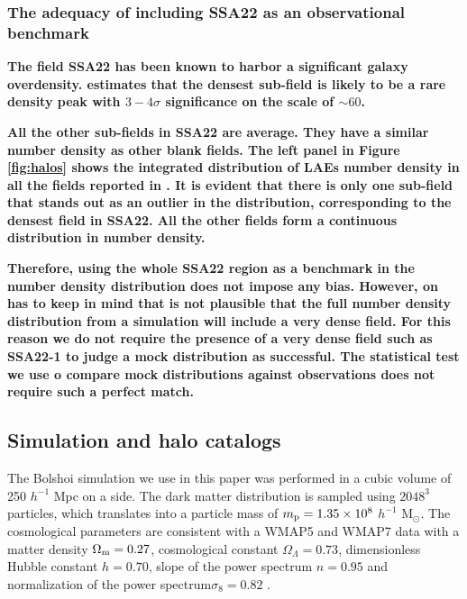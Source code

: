 \documentclass[usenatbib]{mn2e}
\newcommand{\hMpc}{{\ifmmode{h^{-1}{\rm Mpc}}\else{$h^{-1}$Mpc }\fi}}
\begin{document}
\subsubsection{The adequacy of including SSA22 as an observational benchmark}

{\bf The field SSA22 has been known to harbor a significant
  galaxy overdensity. \cite{Yamada2012} estimates that the densest
  sub-field is likely to be a rare density peak with $3-4\sigma$
  significance on the scale of $\sim 60$\hMpc. }

{\bf All the other sub-fields in SSA22 are average. They have a similar
  number density as other blank fields. The left panel in Figure
  \ref{fig:halos} shows the integrated distribution of LAEs number
  density in all the fields reported in  \cite{Yamada2012}. It is
  evident that there is only one sub-field  that stands out as an
  outlier in the distribution, corresponding to  the densest field in
  SSA22. All the other fields form a continuous  distribution in
  number density.}   

{\bf Therefore, using the whole SSA22 region as a benchmark in the
  number density distribution does not impose any bias. However, on
  has to  keep in mind that is not plausible that the full number
  density distribution from a simulation will include a very dense
  field. For this reason we do not require the presence of a very
  dense field such as SSA22-1 to judge a mock distribution as
  successful. The statistical test we use o compare mock
  distributions against observations does not require such a perfect
  match. } 
  


\subsection{Simulation and halo catalogs}

The Bolshoi simulation \citep{Bolshoi} we use in this paper was
performed in a cubic volume of 250 $h^{-1}$ Mpc on a side. The
dark matter distribution is sampled using $2048^{3}$ particles, which
translates into a particle mass of $m_{\rm p}=1.35\times 10^{8}$
$h^{-1}$ M$_{\odot}$.  The cosmological parameters are consistent with
a WMAP5 and WMAP7 data with a matter density $\Omega_{\rm m} = 0.27$,
cosmological constant $\Omega_{\Lambda}=0.73$, dimensionless Hubble constant
$h=0.70$, slope of the power spectrum $n=0.95$ and normalization of the
power spectrum$\sigma_{8}=0.82$ \citep{Komatsu2009,Jarosik2011}.  
\end{document}
